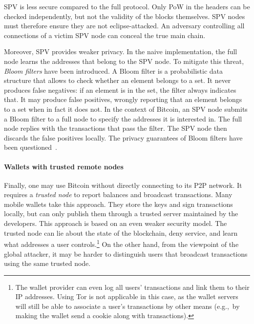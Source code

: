 SPV is less secure compared to the full protocol.
Only PoW in the headers can be checked independently, but not the validity of the blocks themselves.
SPV nodes must therefore ensure they are not eclipse-attacked.
An adversary controlling all connections of a victim SPV node can conceal the true main chain.

Moreover, SPV provides weaker privacy.
In the naive implementation, the full node learns the addresses that belong to the SPV node.
To mitigate this threat, \textit{Bloom filters} have been introduced.
A Bloom filter is a probabilistic data structure that allows to check whether an element belongs to a set.
It never produces false negatives: if an element is in the set, the filter always indicates that.
It may produce false positives, wrongly reporting that an element belongs to a set when in fact it does not.
In the context of Bitcoin, an SPV node submits a Bloom filter to a full node to specify the addresses it is interested in.
The full node replies with the transactions that pass the filter.
The SPV node then discards the false positives locally.
The privacy guarantees of Bloom filters have been questioned~\cite{Gervais2014}.

\paragraph{Wallets with trusted remote nodes}
Finally, one may use Bitcoin without directly connecting to its P2P network.
It requires a \textit{trusted node} to report balances and broadcast transactions.
Many mobile wallets take this approach.
They store the keys and sign transactions locally, but can only publish them through a trusted server maintained by the developers.
This approach is based on an even weaker security model.
The trusted node can lie about the state of the blockchain, deny service, and learn what addresses a user controls.\footnote{The wallet provider can even log all users' transactions and link them to their IP addresses. Using Tor is not applicable in this case, as the wallet servers will still be able to associate a user's transactions by other means (e.g.,~by making the wallet send a cookie along with transactions).}
On the other hand, from the viewpoint of the global attacker, it may be harder to distinguish users that broadcast transactions using the same trusted node.



